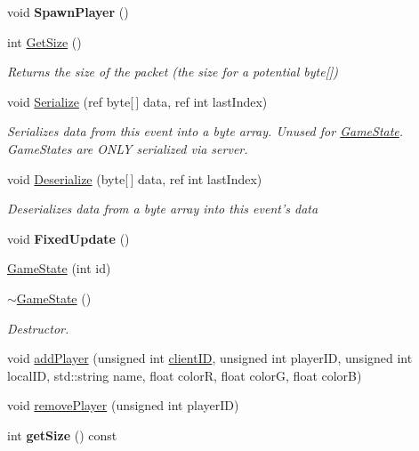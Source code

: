 \begin{DoxyCompactItemize}
\item 
\hypertarget{class_game_state_af2fbb55979f8cc6da50317e1d701e370}{void {\bfseries Spawn\-Player} ()}\label{class_game_state_af2fbb55979f8cc6da50317e1d701e370}

\item 
int \hyperlink{class_game_state_a57d152b243c11aa86e7ba0f07b4bd0dd}{Get\-Size} ()
\begin{DoxyCompactList}\small\item\em Returns the size of the packet (the size for a potential byte\mbox{[}\mbox{]}) \end{DoxyCompactList}\item 
void \hyperlink{class_game_state_af57a06c77a763e8b57841bab79c9b12f}{Serialize} (ref byte\mbox{[}$\,$\mbox{]} data, ref int last\-Index)
\begin{DoxyCompactList}\small\item\em Serializes data from this event into a byte array. Unused for \hyperlink{class_game_state}{Game\-State}. Game\-States are O\-N\-L\-Y serialized via server. \end{DoxyCompactList}\item 
void \hyperlink{class_game_state_aa5f956de2c49182fbe5fc32e9d2ca431}{Deserialize} (byte\mbox{[}$\,$\mbox{]} data, ref int last\-Index)
\begin{DoxyCompactList}\small\item\em Deserializes data from a byte array into this event's data \end{DoxyCompactList}\item 
\hypertarget{class_game_state_a268b639f06e4fa7fa1ca1819cc5d3175}{void {\bfseries Fixed\-Update} ()}\label{class_game_state_a268b639f06e4fa7fa1ca1819cc5d3175}

\item 
\hyperlink{class_game_state_a74a35fb7045c0eee7e68f07c387e2ddf}{Game\-State} (int id)
\item 
\hypertarget{class_game_state_ae623df5042cd0c17daa3394fdcb397b3}{\hyperlink{class_game_state_ae623df5042cd0c17daa3394fdcb397b3}{$\sim$\-Game\-State} ()}\label{class_game_state_ae623df5042cd0c17daa3394fdcb397b3}

\begin{DoxyCompactList}\small\item\em Destructor. \end{DoxyCompactList}\item 
void \hyperlink{class_game_state_ad74bf5767b052d5b32805220ca0c1fab}{add\-Player} (unsigned int \hyperlink{class_game_state_a7c5acf663dc54a1d6de3254209b8fff2}{client\-I\-D}, unsigned int player\-I\-D, unsigned int local\-I\-D, std\-::string name, float color\-R, float color\-G, float color\-B)
\item 
void \hyperlink{class_game_state_a733fa68895adba783b0b4b804f16906f}{remove\-Player} (unsigned int player\-I\-D)
\item 
\hypertarget{class_game_state_ad1a31927652ff2e0f8584527cc90ce24}{int {\bfseries get\-Size} () const }\label{class_game_state_ad1a31927652ff2e0f8584527cc90ce24}


\end{DoxyCompactItemize}
